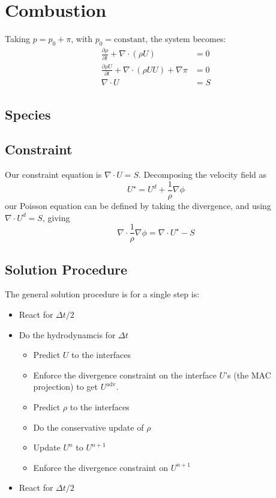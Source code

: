 \section{Combustion}


Taking $p = p_0 + \pi$, with $p_0 = \mathrm{constant}$, the system 
becomes:
\begin{align}
\frac{\partial \rho}{\partial t} + \nabla \cdot (\rho U) &= 0 \\
\frac{\partial \rho U}{\partial t} + \nabla \cdot (\rho U U) + \nabla \pi &= 0 \\
\nabla \cdot U &= S
\end{align}

\subsection{Species}


\subsection{Constraint}

Our constraint equation is $\nabla \cdot U = S$.  Decomposing the
velocity field as
\begin{equation}
U^\star = U^d + \frac{1}{\rho} \nabla \phi
\end{equation}
our Poisson equation can be defined by taking the divergence, and
using $\nabla \cdot U^d = S$, giving
\begin{equation}
\nabla \cdot \frac{1}{\rho} \nabla \phi = \nabla \cdot U^\star - S
\end{equation}


\subsection{Solution Procedure}

The general solution procedure is for a single step is:
\begin{itemize}

  \item React for $\Delta t/2$

  \item Do the hydrodynamcis for $\Delta t$

    \begin{itemize}
    \item Predict $U$ to the interfaces 
    \item Enforce the divergence constraint on the interface $U$'s (the
      MAC projection) to get $U^\mathrm{adv}$.
    \item Predict $\rho$ to the interfaces
    \item Do the conservative update of $\rho$
    \item Update $U^n$ to $U^{n+1}$
    \item Enforce the divergence constraint on $U^{n+1}$
    \end{itemize}

  \item React for $\Delta t/2$

\end{itemize}

